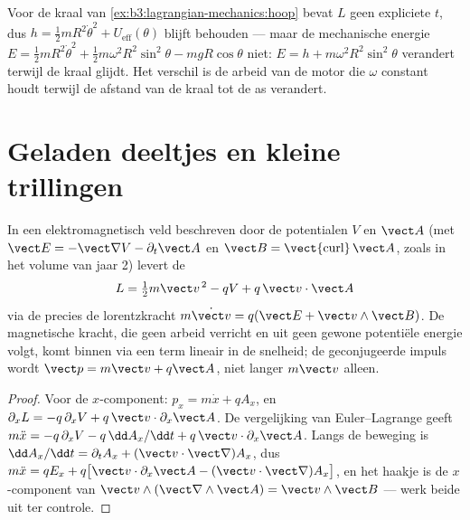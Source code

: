 \begin{example}\label{ex:b3:lagrangian-mechanics:hoop-energy}
Voor de kraal van \cref{ex:b3:lagrangian-mechanics:hoop} bevat $L$ geen
expliciete $t$, dus $h = \tfrac12 mR^2\dot\theta^2 + U_{\text{eff}}
(\theta)$ blijft behouden --- maar de mechanische energie $E = \tfrac12
mR^2\dot\theta^2 + \tfrac12 m\omega^2R^2\sin^2\theta - mgR\cos\theta$ niet:
$E = h + m\omega^2R^2\sin^2\theta$ verandert terwijl de kraal glijdt. Het
verschil is de arbeid van de motor die $\omega$ constant houdt terwijl de
afstand van de kraal tot de as verandert.
\end{example}

\section{Geladen deeltjes en kleine trillingen}

\begin{proposition}\label{prop:b3:lagrangian-mechanics:charge}
In een elektromagnetisch veld beschreven door de potentialen $V$ en
$\vect A$ (met $\vect E = -\vect\nabla V - \partial_t\vect A$ en
$\vect B = \operatorname{\vect{curl}}\vect A$, zoals in het volume van
jaar 2) levert de 
\[
L = \tfrac12 m\vect v^{\,2} - qV + q\,\vect v\cdot\vect A
\]
via de  precies de lorentzkracht
$m\dot{\vect v} = q(\vect E + \vect v\wedge\vect B)$. De magnetische
kracht, die geen arbeid verricht en uit geen gewone potentiële energie
volgt, komt binnen via een term lineair in de snelheid; de geconjugeerde
impuls wordt $\vect p = m\vect v + q\vect A$, niet langer $m\vect v$
alleen.
\end{proposition}

\begin{proof}
Voor de $x$-component: $p_x = m\dot x + qA_x$, en
$\partial_xL = -q\,\partial_xV + q\,\vect v\cdot\partial_x\vect A$. De
vergelijking van Euler--Lagrange geeft $m\ddot x = -q\,\partial_xV -
q\,\dd A_x/\dd t + q\,\vect v\cdot\partial_x\vect A$. Langs de beweging is
$\dd A_x/\dd t = \partial_tA_x + (\vect v\cdot\vect\nabla)A_x$, dus
$m\ddot x = qE_x + q\big[\vect v\cdot\partial_x\vect A - (\vect v\cdot
\vect\nabla)A_x\big]$, en het haakje is de $x$-component van $\vect
v\wedge(\vect\nabla\wedge\vect A) = \vect v\wedge\vect B$ --- werk beide
uit ter controle.
\end{proof}

